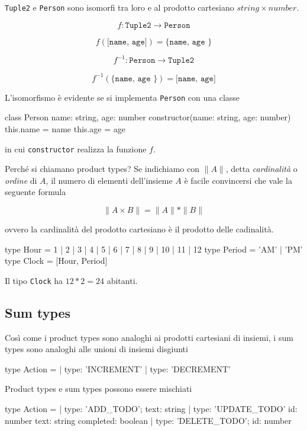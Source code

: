 \documentclass[12pt]{article}
\theoremstyle{definition}
\newenvironment{code}
  {\vspace{0.5cm} \VerbatimEnvironment\begin{typescriptcode}}
  {\end{typescriptcode} \vspace{0.2cm}}
\begin{document}
\texttt{Tuple2} e \texttt{Person} sono isomorfi tra loro e al prodotto cartesiano $string \times number$.

$$
f: \texttt{Tuple2} \rightarrow \texttt{Person}
$$

$$
f(\texttt{[name, age]}) = \texttt{\{ name, age  \}}
$$

$$
f^{-1}: \texttt{Person} \rightarrow \texttt{Tuple2}
$$

$$
f^{-1}(\texttt{\{ name, age  \}}) = \texttt{[name, age]}
$$

L'isomorfismo è evidente se si implementa \texttt{Person} con una classe

\begin{code}
class Person {
  name: string,
  age: number
  constructor(name: string, age: number) {
    this.name = name
    this.age = age
  }
}
\end{code}

in cui \texttt{constructor} realizza la funzione $f$.

Perché si chiamano product types? Se indichiamo con $\|A\|$, detta \emph{cardinalità} o \emph{ordine} di $A$, il numero di elementi
dell'insieme $A$ è facile convincersi che vale la seguente formula

$$
\|A \times B\| = \|A\| * \|B\|
$$

ovvero la cardinalità del prodotto cartesiano è il prodotto delle cadinalità.

\begin{code}
type Hour = 1 | 2 | 3 | 4 | 5 | 6 | 7 | 8 | 9 | 10 | 11 | 12
type Period = 'AM' | 'PM'
type Clock = [Hour, Period]
\end{code}

Il tipo \texttt{Clock} ha $12 * 2 = 24$ abitanti.

\subsection{Sum types}

Così come i product types sono analoghi ai prodotti cartesiani di insiemi, i sum types sono analoghi alle unioni di insiemi disgiunti

\begin{code}
type Action =
  | { type: 'INCREMENT' }
  | { type: 'DECREMENT' }
\end{code}

Product types e sum types possono essere mischiati

\begin{code}
type Action =
  | { type: 'ADD_TODO'; text: string }
  | {
      type: 'UPDATE_TODO'
      id: number
      text: string
      completed: boolean
    }
  | { type: 'DELETE_TODO'; id: number }
\end{code}
\end{document}
